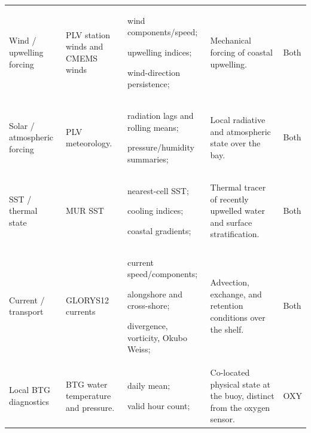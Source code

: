 \begin{small}
\begin{longtable}{P{2.4cm}P{3.2cm}P{4.9cm}P{4.4cm}P{1cm}}
  Wind / upwelling forcing
  & PLV station winds and CMEMS winds \citep{copernicus_wind_l4}
  & \begin{tabitemize}[leftmargin=*, nosep, topsep=0pt]
    \item wind components/speed;
    \item upwelling indices;
    \item wind-direction persistence;
    \end{tabitemize}
  & Mechanical forcing of coastal upwelling.
  & Both \\

  Solar / atmospheric forcing
  & PLV meteorology.
  & \begin{tabitemize}[leftmargin=*, nosep, topsep=0pt]
    \item radiation lags and rolling means;
    \item pressure/humidity summaries;
  \end{tabitemize}
  & Local radiative and atmospheric state over the bay.
  & Both \\

  SST / thermal state
  & MUR SST \citep{jpl_mur_sst}
  & \begin{tabitemize}[leftmargin=*, nosep, topsep=0pt]
    \item nearest-cell SST;
    \item cooling indices;
    \item coastal gradients;
  \end{tabitemize}
  & Thermal tracer of recently upwelled water and surface stratification.
  & Both \\

  Current / transport
  & GLORYS12 currents \citep{lellouche2021glorys12,copernicus_glorys12}
  & \begin{tabitemize}[leftmargin=*, nosep, topsep=0pt]
    \item current speed/components;
    \item alongshore and cross-shore;
    \item divergence, vorticity, Okubo Weiss;
  \end{tabitemize}
  & Advection, exchange, and retention conditions over the shelf.
  & Both \\

  Local BTG diagnostics
  & BTG water temperature and pressure.
  & \begin{tabitemize}[leftmargin=*, nosep, topsep=0pt]
    \item daily mean;
    \item valid hour count;
  \end{tabitemize}
  & Co-located physical state at the buoy, distinct from the oxygen sensor.
  & OXY \\
\end{longtable}
\end{small}

